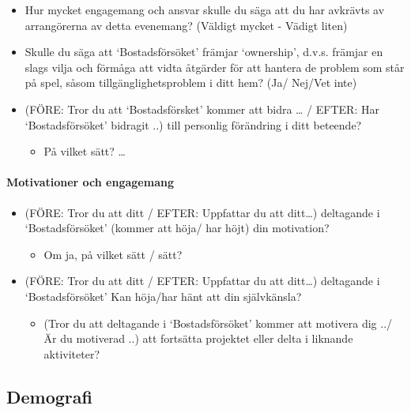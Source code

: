 \documentclass[]{tufte-handout}
\providecommand{\tightlist}{%
  \setlength{\itemsep}{0pt}\setlength{\parskip}{0pt}}
\begin{document}
\begin{itemize}
\tightlist
\item
  Hur mycket engagemang och ansvar skulle du säga att du har avkrävts av
  arrangörerna av detta evenemang? (Väldigt mycket - Vädigt liten)
\item
  Skulle du säga att `Bostadsförsöket' främjar `ownership', d.v.s.
  främjar en slags vilja och förmåga att vidta åtgärder för att hantera
  de problem som står på spel, såsom tillgänglighetsproblem i ditt hem?
  (Ja/ Nej/Vet inte)
\item
  (FÖRE: Tror du att `Bostadsförsket' kommer att bidra \ldots{} / EFTER:
  Har `Bostadsförsöket' bidragit ..) till personlig förändring i ditt
  beteende?

  \begin{itemize}
  \tightlist
  \item
    På vilket sätt? \ldots{}
  \end{itemize}
\end{itemize}

\hypertarget{motivationer-och-engagemang}{%
\paragraph{Motivationer och
engagemang}\label{motivationer-och-engagemang}}

\begin{itemize}
\tightlist
\item
  (FÖRE: Tror du att ditt / EFTER: Uppfattar du att ditt\ldots)
  deltagande i `Bostadsförsöket' (kommer att höja/ har höjt) din
  motivation?

  \begin{itemize}
  \tightlist
  \item
    Om ja, på vilket sätt / sätt?
  \end{itemize}
\item
  (FÖRE: Tror du att ditt / EFTER: Uppfattar du att ditt\ldots)
  deltagande i `Bostadsförsöket' Kan höja/har hänt att din självkänsla?

  \begin{itemize}
  \tightlist
  \item
    (Tror du att deltagande i `Bostadsförsöket' kommer att motivera dig
    ../ Är du motiverad ..) att fortsätta projektet eller delta i
    liknande aktiviteter?
  \end{itemize}
\end{itemize}

\hypertarget{demografi}{%
\subsection{Demografi}\label{demografi}}
\end{document}
